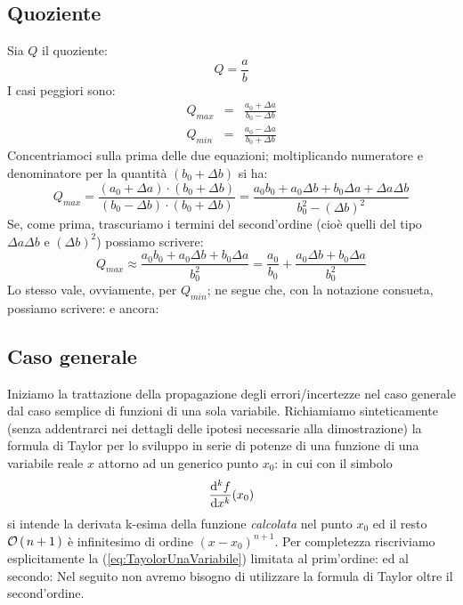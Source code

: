 \subsection{Quoziente}

Sia $Q$ il quoziente:
$$
Q=\frac{a}{b}
$$
I casi peggiori sono:
\begin{eqnarray*}
Q_{max} & = & \frac{a_0 + \Delta a}{b_0 - \Delta b}\\
Q_{min} & = & \frac{a_0 - \Delta a}{b_0 + \Delta b}
\end{eqnarray*}
Concentriamoci sulla prima delle due equazioni; moltiplicando numeratore e
denominatore per la quantit\`a $(b_0 + \Delta b)$ si ha:
$$
Q_{max} = \frac{(a_0 + \Delta a) \cdot (b_0 + \Delta b)}
{(b_0 - \Delta b) \cdot (b_0 + \Delta b)} = 
\frac{a_0 b_0 + a_0 \Delta b + b_0 \Delta a + \Delta a \Delta b}
{b_0^2 - (\Delta b)^2}
$$
Se, come prima, trascuriamo i termini del second'ordine (cio\`e quelli
del tipo $\Delta a \Delta b$ e $(\Delta b)^2$) possiamo scrivere:
$$
Q_{max} \approx \frac{a_0 b_0 + a_0 \Delta b + b_0 \Delta a}{b_0^2} =
\frac{a_0}{b_0} + \frac{a_0 \Delta b + b_0 \Delta a}{b_0^2}
$$
Lo stesso vale, ovviamente, per $Q_{min}$; ne segue che, con la notazione
consueta, possiamo scrivere:
e ancora:


\subsection{Caso generale}

Iniziamo la trattazione della propagazione degli errori/incertezze nel caso
generale dal caso semplice di funzioni di una sola variabile.
Richiamiamo sinteticamente (senza addentrarci nei dettagli delle ipotesi
necessarie alla dimostrazione) la formula di Taylor per lo sviluppo in serie
di potenze di una funzione di una variabile reale $x$ attorno ad un generico
punto $x_0$:
in cui con il simbolo 
$$
\tndereval{f}{x}{x_0}{k}
$$
si intende la derivata k-esima della funzione \emph{calcolata} nel punto
$x_0$ ed il resto $\orderof{n+1}$ \`e infinitesimo di ordine $(x - x_0)^{n+1}$.
Per completezza riscriviamo esplicitamente la (\ref{eq:TayolorUnaVariabile})
limitata al prim'ordine:
ed al secondo:
Nel seguito non avremo bisogno di utilizzare la formula di Taylor
oltre il second'ordine.

